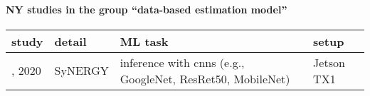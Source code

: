 \paragraph{NY studies in the group ``data-based estimation model''} 
 \label{tab:NY-data-based-estimation-model} 
\begin{longtable}{|>{\raggedright\arraybackslash}p{0.85cm}|p{4cm}|p{6cm}|>{\raggedright\arraybackslash}p{3.75cm}|}
\toprule
\bfseries study & \bfseries detail & \bfseries ML task & \bfseries setup \\
\midrule 
\endhead
\cite{rodrigues2020}, 2020 & SyNERGY & inference with \acrshort{cnn}s (e.g., GoogleNet, ResRet50, MobileNet) & Jetson TX1 \\
\bottomrule
\end{longtable}
